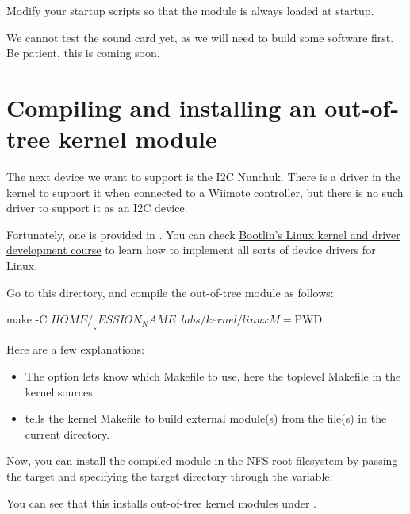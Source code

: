 {Modify your startup scripts so that the  module
is always loaded at startup.

We cannot test the sound card yet, as we will need to build some
software first. Be patient, this is coming soon.

\section{Compiling and installing an out-of-tree kernel module}

The next device we want to support is the I2C Nunchuk. There is a driver
in the kernel to support it when connected to a Wiimote controller, but
there is no such driver to support it as an I2C device.

Fortunately, one is provided in
. You can check
\href{https://bootlin.com/training/kernel/}{Bootlin's Linux kernel and
driver development course} to learn how to implement all sorts of device
drivers for Linux.

Go to this directory, and compile the out-of-tree module as follows:

\begin{bashinput}
make -C $HOME/__SESSION_NAME__-labs/kernel/linux M=$PWD
\end{bashinput}

Here are a few explanations:
\begin{itemize}
\item The  option lets  know which Makefile to
      use, here the toplevel Makefile in the kernel sources.
\item {} tells the kernel Makefile to build external
      module(s) from the file(s) in the current directory.
\end{itemize}

Now, you can install the compiled module in the NFS root filesystem
by passing the  target and specifying the
target directory through the  variable:


You can see that this installs out-of-tree kernel modules under
.

}

